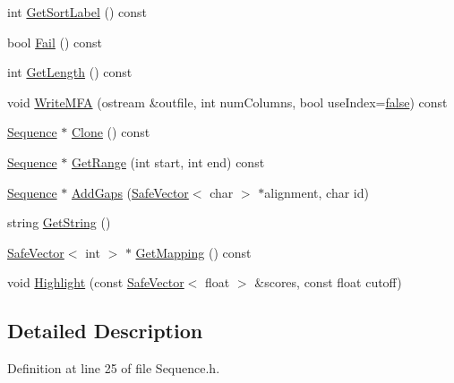 \begin{DoxyCompactItemize}
\item 
int \hyperlink{class_p_r_o_b_c_o_n_s_1_1_sequence_ac6457a791587730ec84a37c2c282b293}{Get\+Sort\+Label} () const 
\item 
bool \hyperlink{class_p_r_o_b_c_o_n_s_1_1_sequence_aa8f82350156d0a936607de8143ceec9f}{Fail} () const 
\item 
int \hyperlink{class_p_r_o_b_c_o_n_s_1_1_sequence_af5ceae645f42aac617f6917ab83505ae}{Get\+Length} () const 
\item 
void \hyperlink{class_p_r_o_b_c_o_n_s_1_1_sequence_a1cc32e85eb6efd4772e7072a7bdf4b43}{Write\+M\+F\+A} (ostream \&outfile, int num\+Columns, bool use\+Index=\hyperlink{naview_8c_a65e9886d74aaee76545e83dd09011727}{false}) const 
\item 
\hyperlink{class_p_r_o_b_c_o_n_s_1_1_sequence}{Sequence} $\ast$ \hyperlink{class_p_r_o_b_c_o_n_s_1_1_sequence_a10cc0709238283137a74acd8e16f07e1}{Clone} () const 
\item 
\hyperlink{class_p_r_o_b_c_o_n_s_1_1_sequence}{Sequence} $\ast$ \hyperlink{class_p_r_o_b_c_o_n_s_1_1_sequence_a818e8bce38326ec0b605bf17df0fc5f8}{Get\+Range} (int start, int end) const 
\item 
\hyperlink{class_p_r_o_b_c_o_n_s_1_1_sequence}{Sequence} $\ast$ \hyperlink{class_p_r_o_b_c_o_n_s_1_1_sequence_a801feb329a2d5f5f6e89ec1dbeb5a4d5}{Add\+Gaps} (\hyperlink{class_p_r_o_b_c_o_n_s_1_1_safe_vector}{Safe\+Vector}$<$ char $>$ $\ast$alignment, char id)
\item 
string \hyperlink{class_p_r_o_b_c_o_n_s_1_1_sequence_a43e75de0a16168e4c5a97c4638149c98}{Get\+String} ()
\item 
\hyperlink{class_p_r_o_b_c_o_n_s_1_1_safe_vector}{Safe\+Vector}$<$ int $>$ $\ast$ \hyperlink{class_p_r_o_b_c_o_n_s_1_1_sequence_a4af4f994f698e665510154d4c727cf26}{Get\+Mapping} () const 
\item 
void \hyperlink{class_p_r_o_b_c_o_n_s_1_1_sequence_aa1954078d6043b31cb73db5c69449d67}{Highlight} (const \hyperlink{class_p_r_o_b_c_o_n_s_1_1_safe_vector}{Safe\+Vector}$<$ float $>$ \&scores, const float cutoff)
\end{DoxyCompactItemize}


\subsection{Detailed Description}


Definition at line 25 of file Sequence.\+h.




